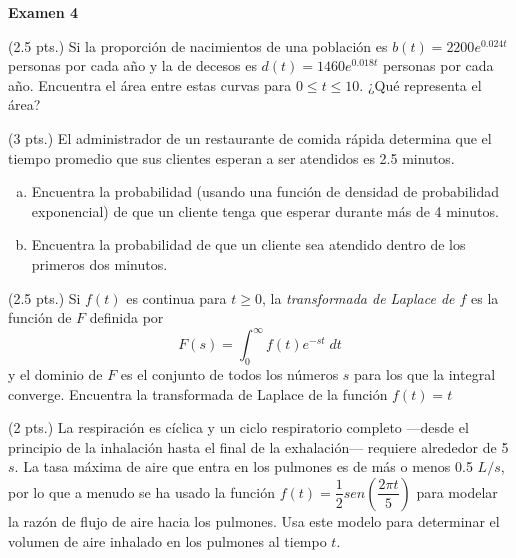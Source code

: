\documentclass[12pt]{exam}
\begin{document}
\centering


\Large 
\textbf{Examen 4}\\


\normalsize

\pointformat{\bfseries\boldmath(\thepoints)}
\vskip12pt

    
    \begin{questions}

     \question (2.5 pts.)
       Si la proporción de nacimientos de una población es $b(t)=2200e^{0.024t}$ personas por cada año y la de decesos es $d(t)=1460e^{0.018t}$ personas por cada año. Encuentra el área entre estas curvas para $0\leq t\leq 10$. ¿Qué representa el área?
    
\vskip10pt
\question (3 pts.)
El administrador de un restaurante de comida rápida determina que el tiempo promedio que sus clientes esperan a ser atendidos es 2.5 minutos.
\begin{enumerate}[a)]
\item Encuentra la probabilidad (usando una función de densidad de probabilidad exponencial) de que un cliente tenga que esperar durante más de 4 minutos.
\item Encuentra la probabilidad de que un cliente sea atendido
dentro de los primeros dos minutos.
\end{enumerate}
\vskip10pt
    \question  (2.5 pts.) Si $f(t)$ es continua para $t\geq 0$, la \textit{transformada de Laplace de $f$} es la función de $F$ definida por $$F(s)=\displaystyle\int_0^\infty f(t)e^{-st}\;dt$$
    y el dominio de $F$ es el conjunto de todos los números $s$ para los que la integral converge. Encuentra la transformada de Laplace de la  función $f(t)=t$
    
\vskip10pt

 \question  (2 pts.) La respiración es cíclica y un ciclo respiratorio completo —desde el principio de la inhalación hasta el final de la exhalación— requiere alrededor de 5 $s$. La tasa máxima de aire que entra en los pulmones es de más o menos 0.5 $L/s$, por lo que a menudo se ha usado la función $f(t)=\dfrac{1}{2}sen\left(\dfrac{2\pi t}{5}\right)$ para modelar la razón de flujo de aire hacia los pulmones. Usa este modelo para determinar el volumen de aire inhalado en los pulmones al tiempo $t$.
\vskip10pt


\end{questions}
\end{document}
